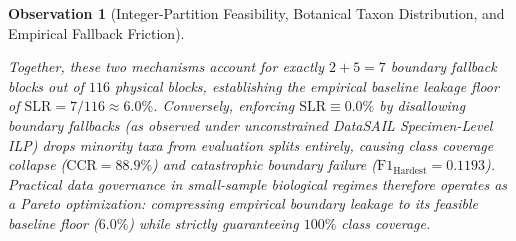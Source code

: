 \documentclass[a4paper,fleqn]{cas-sc}
\newtheorem{observation}{Observation}
\begin{document}
\begin{observation}[Integer-Partition Feasibility, Botanical Taxon Distribution, and Empirical Fallback Friction]
\begin{itemize}
\end{itemize}
Together, these two mechanisms account for exactly $2 + 5 = 7$ boundary fallback blocks out of $116$ physical blocks, establishing the empirical baseline leakage floor of $\mathrm{SLR} = 7 / 116 \approx 6.0\%$. Conversely, enforcing $\mathrm{SLR} \equiv 0.0\%$ by disallowing boundary fallbacks (as observed under unconstrained DataSAIL Specimen-Level ILP) drops minority taxa from evaluation splits entirely, causing class coverage collapse ($\mathrm{CCR} = 88.9\%$) and catastrophic boundary failure ($\mathrm{F1}_{\text{Hardest}} = 0.1193$). Practical data governance in small-sample biological regimes therefore operates as a Pareto optimization: compressing empirical boundary leakage to its feasible baseline floor ($6.0\%$) while strictly guaranteeing $100\%$ class coverage.
\end{observation}
\end{document}
